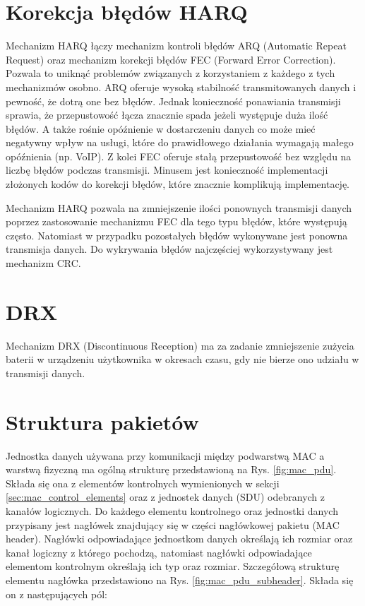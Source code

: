 \section{Korekcja błędów HARQ}

Mechanizm HARQ łączy mechanizm kontroli błędów ARQ (Automatic Repeat Request) oraz mechanizm korekcji błędów FEC (Forward Error Correction). Pozwala to uniknąć problemów związanych z korzystaniem z każdego z tych mechanizmów osobno. 
ARQ oferuje wysoką stabilność transmitowanych danych i pewność, że dotrą one bez błędów. Jednak konieczność ponawiania transmisji sprawia, że przepustowość łącza znacznie spada jeżeli występuje duża ilość błędów. A także rośnie opóźnienie w dostarczeniu danych co może mieć negatywny wpływ na usługi, które do prawidłowego działania wymagają małego opóźnienia (np. VoIP).
Z kolei FEC oferuje stałą przepustowość bez względu na liczbę błędów podczas transmisji. Minusem jest konieczność implementacji złożonych kodów do korekcji błędów, które znacznie komplikują implementację.

Mechanizm HARQ pozwala na zmniejszenie ilości ponownych transmisji danych poprzez zastosowanie mechanizmu FEC dla tego typu błędów, które występują często. Natomiast w przypadku pozostałych błędów wykonywane jest ponowna transmisja danych. Do wykrywania błędów najczęściej wykorzystywany jest mechanizm CRC.

\section{DRX}

Mechanizm DRX (Discontinuous Reception) ma za zadanie zmniejszenie zużycia baterii w urządzeniu użytkownika w okresach czasu, gdy nie bierze ono udziału w transmisji danych.

\section{Struktura pakietów}

Jednostka danych używana przy komunikacji między podwarstwą MAC a warstwą fizyczną ma ogólną strukturę przedstawioną na Rys. \ref{fig:mac_pdu}. Składa się ona z elementów kontrolnych wymienionych w sekcji \ref{sec:mac_control_elements} oraz z jednostek danych (SDU) odebranych z kanałów logicznych. Do każdego elementu kontrolnego oraz jednostki danych przypisany jest nagłówek znajdujący się w części nagłówkowej pakietu (MAC header). Nagłówki odpowiadające jednostkom danych określają ich rozmiar oraz kanał logiczny z którego pochodzą, natomiast nagłówki odpowiadające elementom kontrolnym określają ich typ oraz rozmiar. Szczegółową strukturę elementu nagłówka przedstawiono na Rys. \ref{fig:mac_pdu_subheader}. Składa się on z następujących pól:

